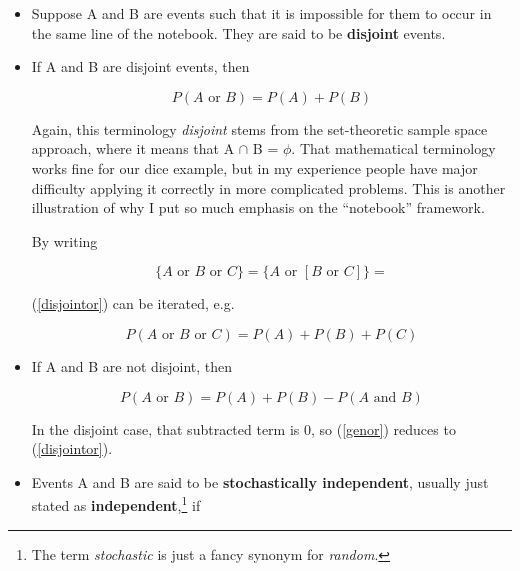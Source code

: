 \begin{itemize}

\item 
\begin{definition}
Suppose A and B are events such that it is impossible for them to
occur in the same line of the notebook.  They are said to be {\bf
disjoint} events.  
\end{definition}

\item If A and B are disjoint events, then 

\begin{equation}
\label{disjointor}
P(A \textrm{ or } B) = P(A) + P(B)
\end{equation}

Again, this terminology {\it disjoint} stems from the set-theoretic
sample space approach, where it means that A $\cap$ B = $\phi$.  That
mathematical terminology works fine for our dice example, but in my
experience people have major difficulty applying it correctly in more
complicated problems.  This is another illustration of why I put so much
emphasis on the ``notebook'' framework.

By writing 

\begin{equation}
\{ A \textrm{ or } B \textrm{ or } C \} =
\{ A \textrm{ or } [B \textrm{ or } C ] \} =
\end{equation}

(\ref{disjointor}) can be iterated, e.g.

\begin{equation}
P(A \textrm{ or } B \textrm{ or } C) = P(A) + P(B) + P(C)
\end{equation}

\item If A and B are not disjoint, then

\begin{equation}
\label{genor}
P(A \textrm{ or } B) = P(A) + P(B) - P(A \textrm{ and } B)
\end{equation}

In the disjoint case, that subtracted term is 0, so (\ref{genor})
reduces to (\ref{disjointor}).

\item 
\begin{definition}
Events A and B are said to be {\bf stochastically independent},
usually just stated as {\bf independent},\footnote{The term {\it
stochastic} is just a fancy synonym for {\it random}.} if 
\end{definition}


\end{itemize}
